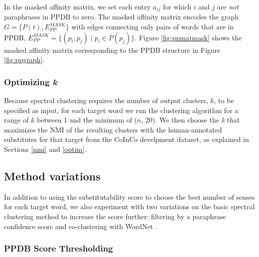 \documentclass[11pt]{article}
\begin{document}
In the masked affinity matrix, we set each entry $a_{ij}$ for which $i$ and $j$ are \textit{not} paraphrases in PPDB to zero. The masked affinity matrix encodes the graph $G = \{P(t), E_{PP}^{MASK}\}$ with edges connecting only pairs of words that are in PPDB, $E_{PP}^{MASK} = \{(p_i, p_j) \mid p_i \in P(p_j)\}$. Figure \ref{fig:ppmatmask} shows the masked affinity matrix corresponding to the PPDB structure in Figure \ref{fig:ppgraph}.

\subsubsection{Optimizing \textit{k}}
\label{optimk}

Because spectral clustering requires the number of output clusters, $k$, to be specified as input, for each target word we run the clustering algorithm for a range of $k$ between 1 and the minimum of ($n$,  20). We then choose the \textit{k} that maximizes the NMI of the resulting clusters with the human-annotated substitutes for that target from the CoInCo develpment dataset, as explained in Sections \ref{nmi} and \ref{optim}.

\subsection{Method variations}

In addition to using the substitutability score to choose the best number of senses for each target word, we also experiment with %
two variations on the basic spectral clustering method to increase the score further: filtering by a paraphrase confidence score and co-clustering with WordNet \cite{fellbaum98wordnet}. 


\subsubsection{PPDB Score Thresholding}
\end{document}
